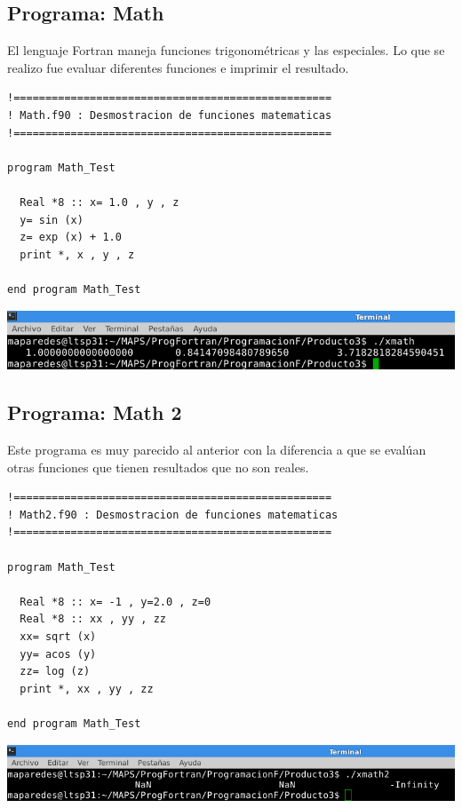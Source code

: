 \documentclass[12pt]{article}
\begin{document}
\subsection{Programa: Math}
El lenguaje Fortran maneja funciones trigonométricas y las especiales. Lo que se realizo fue evaluar diferentes funciones e imprimir el resultado.
\begin{verbatim}
!==================================================
! Math.f90 : Desmostracion de funciones matematicas
!==================================================

program Math_Test
  
  Real *8 :: x= 1.0 , y , z
  y= sin (x)
  z= exp (x) + 1.0
  print *, x , y , z
  
end program Math_Test
\end{verbatim}
\begin{center}
\includegraphics[width=15cm]{Math}
\end{center}

\subsection{Programa: Math 2}
Este programa es muy parecido al anterior con la diferencia a que se evalúan otras funciones que tienen resultados que no son reales.
\begin{verbatim}
!==================================================
! Math2.f90 : Desmostracion de funciones matematicas
!==================================================

program Math_Test

  Real *8 :: x= -1 , y=2.0 , z=0
  Real *8 :: xx , yy , zz
  xx= sqrt (x)
  yy= acos (y)
  zz= log (z)
  print *, xx , yy , zz 
  
end program Math_Test
\end{verbatim}
\begin{center}
\includegraphics[width=15cm]{Math2}
\end{center}
\pagebreak
\end{document}
